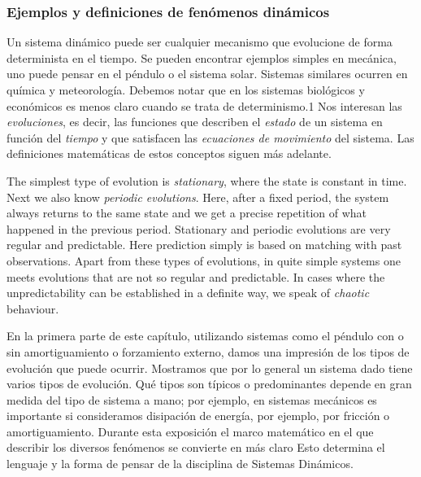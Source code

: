 \documentclass{beamer}
\begin{document}
\begin{frame}
    \frametitle{Ejemplos y definiciones de fen\'omenos din\'amicos}
    
    Un sistema dinámico puede ser cualquier mecanismo que evolucione de forma determinista en el tiempo.
Se pueden encontrar ejemplos simples en mecánica, uno puede pensar en el péndulo o el
sistema solar. Sistemas similares ocurren en química y meteorología. Debemos notar
que en los sistemas biológicos y económicos es menos claro cuando se trata de
determinismo.1 Nos interesan las \emph{evoluciones}, es decir, las funciones que describen el
\emph{estado} de un sistema en función del \emph{tiempo} y que satisfacen las \emph{ecuaciones de movimiento} del
sistema. Las definiciones matemáticas de estos conceptos siguen más adelante.

\end{frame}

\begin{frame}

The simplest type of evolution is \emph{stationary}, where the state is constant in time.
Next we also know \emph{periodic evolutions}. Here, after a fixed period, the system always
returns to the same state and we get a precise repetition of what happened in the
previous period. Stationary and periodic evolutions are very regular and predictable.
Here prediction simply is based on matching with past observations. Apart from
these types of evolutions, in quite simple systems one meets evolutions that are not
so regular and predictable. In cases where the unpredictability can be established in
a definite way, we speak of \emph{chaotic} behaviour.

\end{frame}

\begin{frame}

En la primera parte de este capítulo, utilizando sistemas como el péndulo con o sin
amortiguamiento o forzamiento externo, damos una impresión de los tipos de evolución
que puede ocurrir. Mostramos que por lo general un sistema dado tiene varios tipos de evolución.
Qué tipos son típicos o predominantes depende en gran medida del tipo de sistema
a mano; por ejemplo, en sistemas mecánicos es importante si consideramos
disipación de energía, por ejemplo, por fricción o amortiguamiento. Durante esta exposición
el marco matemático en el que describir los diversos fenómenos se convierte en
más claro Esto determina el lenguaje y la forma de pensar de la disciplina de
Sistemas Dinámicos.

\end{frame}
\end{document}
